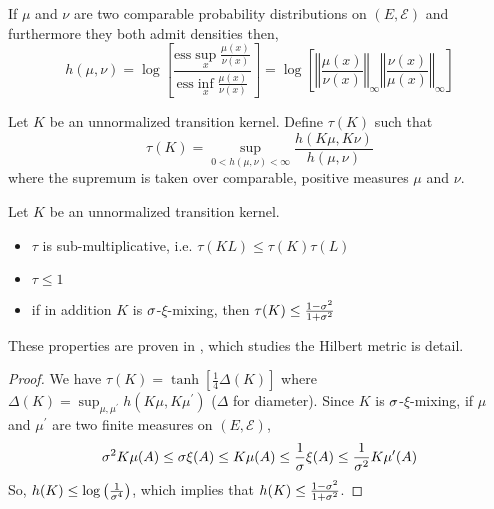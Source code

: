\begin{proposition} If $\mu$ and $\nu$ are two comparable probability distributions on $(E, \mathcal E)$ and furthermore they both admit densities then,
\begin{equation}
h(\mu, \nu)=\log\left[\frac{\textrm{ess}\sup_x \frac{\mu(x)}{\nu(x)}}{\textrm{ess}\inf_x\frac{\mu(x)}{\nu(x)}}\right] = \log \left[\left\Vert\frac{\mu(x)}{\nu(x)}\right\Vert_\infty\left\Vert\frac{\nu(x)}{\mu(x)}\right\Vert_\infty\right]
\end{equation}
\end{proposition}

\begin{definition}
Let $K$ be an unnormalized transition kernel. Define $\tau(K)$ such that
\begin{equation}
    \tau(K) = \sup_{0 < h(\mu, \nu) < \infty} \frac{h(K\mu, K\nu)}{h(\mu, \nu)}
\end{equation}
where the supremum is taken over comparable, positive measures $\mu$ and $\nu$.
\end{definition}

\begin{proposition}\label{prop:hilbert}
Let $K$ be an unnormalized transition kernel.
\begin{itemize}
    \item $\tau$ is sub-multiplicative, i.e. $\tau(KL)\leq \tau(K)\tau(L)$
    \item $\tau \leq 1$
    \item if in addition $K$ is $\sigma$-$\xi$-mixing, then $\tau(K) \leq \frac{1- \sigma^2}{1 + \sigma^2}$
\end{itemize}
\end{proposition}

These properties are proven in \cite{cohen}, which studies the Hilbert metric is detail.

\begin{proof} We have $\tau(K) = \tanh\left[\frac{1}{4}\Delta(K)\right]$ where $\Delta(K) = \sup_{\mu, \mu^\prime}h(K\mu, K\mu^\prime)$ ($\Delta$ for diameter). Since $K$ is $\sigma$-$\xi$-mixing, if $\mu$ and $\mu^\prime$ are two finite measures on $(E, \mathcal E)$,
\begin{equation}
    \sigma^2K\mu(A)\leq\sigma\xi(A)\leq K\mu(A)\leq \frac{1}{\sigma}\xi(A) \leq \frac{1}{\sigma^2}K\mu^\prime(A)
\end{equation}
   So, $h(K) \leq \log\left(\frac{1}{\sigma^4}\right)$, which implies that $h(K) \leq \frac{1 - \sigma^2}{1 + \sigma^2}$.
\end{proof}


